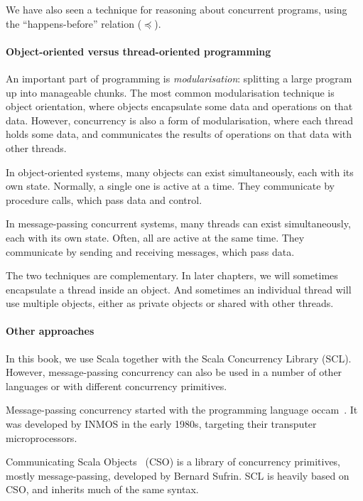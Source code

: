 We have also seen a technique for reasoning about concurrent programs, using
the ``happens-before'' relation ($\preceq$).


\paragraph{Object-oriented versus thread-oriented programming}

An important part of programming is
\emph{modularisation}: splitting a large program up into
manageable chunks.  The most common modularisation technique is object
orientation, where objects encapsulate some data and operations on that data.
However, concurrency is also a form of modularisation, where each thread holds
some data, and communicates the results of operations on that data with other
threads.

In object-oriented systems, many objects can exist simultaneously, each with
its own state.  Normally, a single one is active at a time.  They communicate
by procedure calls, which pass data and control.

In message-passing concurrent systems, many threads can exist simultaneously,
each with its own state.  Often, all are active at the same time.  They
communicate by sending and receiving messages, which pass data.

The two techniques are complementary.  In later chapters, we will sometimes
encapsulate a thread inside an object.  And sometimes an individual thread
will use multiple objects, either as private objects or shared with other
threads. 


\paragraph{Other approaches}

In this book, we use Scala together with the Scala Concurrency Library (SCL).
However, message-passing concurrency can also be used in a number of other
languages or with different concurrency primitives.

Message-passing concurrency started with the programming language {\sf
  occam}~\cite{occam}.  It was developed by INMOS in the early 1980s,
targeting their transputer microprocessors.

Communicating Scala Objects~\cite{CSO} (CSO) is a library of concurrency
primitives, mostly message-passing, developed by Bernard Sufrin.  SCL is
heavily based on CSO, and inherits much of the same syntax.

